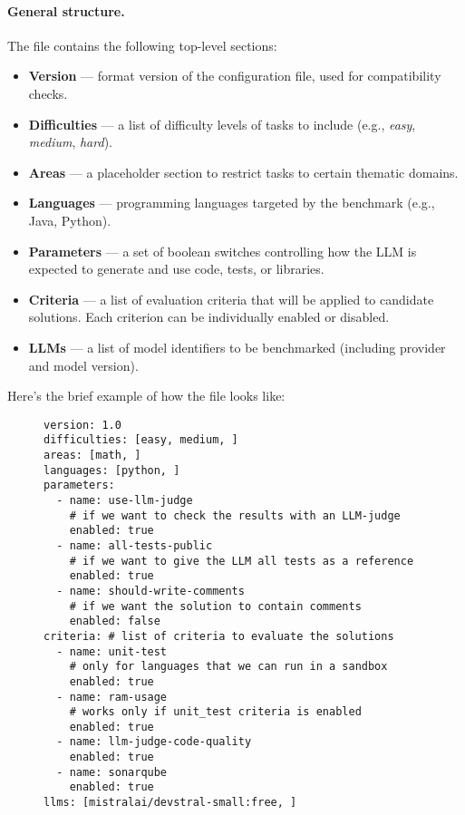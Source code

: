 \paragraph{General structure.}
The file contains the following top-level sections:

\begin{itemize}
    \item \textbf{Version} --- format version of the configuration file, used for compatibility checks.
    \item \textbf{Difficulties} --- a list of difficulty levels of tasks to include (e.g., \emph{easy}, \emph{medium}, \emph{hard}).
    \item \textbf{Areas} --- a placeholder section to restrict tasks to certain thematic domains.
    \item \textbf{Languages} --- programming languages targeted by the benchmark (e.g., Java, Python).
    \item \textbf{Parameters} --- a set of boolean switches controlling how the LLM is expected to generate and use code, tests, or libraries.
    \item \textbf{Criteria} --- a list of evaluation criteria that will be applied to candidate solutions. Each criterion can be individually enabled or disabled.
    \item \textbf{LLMs} --- a list of model identifiers to be benchmarked (including provider and model version).
\end{itemize}

Here's the brief example of how the file looks like:

\begin{figure}[H]
\centering
\begin{verbatim}
version: 1.0
difficulties: [easy, medium, ]
areas: [math, ]
languages: [python, ]
parameters:
  - name: use-llm-judge         
    # if we want to check the results with an LLM-judge
    enabled: true
  - name: all-tests-public      
    # if we want to give the LLM all tests as a reference
    enabled: true
  - name: should-write-comments 
    # if we want the solution to contain comments
    enabled: false
criteria: # list of criteria to evaluate the solutions
  - name: unit-test
    # only for languages that we can run in a sandbox
    enabled: true
  - name: ram-usage
    # works only if unit_test criteria is enabled
    enabled: true
  - name: llm-judge-code-quality
    enabled: true
  - name: sonarqube
    enabled: true
llms: [mistralai/devstral-small:free, ]
\end{verbatim}
\end{figure}

